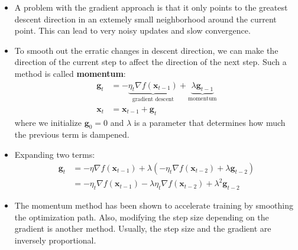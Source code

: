 \documentclass{article}
\newcommand{\tbf}[1]{\textbf{#1}}
\newcommand{\mbf}[1]{\mathbf{#1}}
\begin{document}
        \begin{itemize}
            \item A problem with the gradient approach is that it only points to the greatest descent direction in an extemely small neighborhood around the current point. 
            This can lead to very noisy updates and slow convergence.
            \item To smooth out the erratic changes in descent direction, we can make the direction of the current step to affect the direction of the next step. Such a method is called \tbf{momentum}:
            \begin{align*}
                \mbf{g}_t &= - \underbrace{\eta_t \nabla f(\mbf{x}_{t-1})}_{\text{gradient descent}} + \underbrace{\lambda \mbf{g}_{t-1}}_{\text{momentum}} \\
                \mbf{x}_t &= \mbf{x}_{t-1} + \mbf{g}_t
            \end{align*}
            where we initialize $\mbf{g}_0 = 0$ and $\lambda$ is a parameter that determines how much the previous term is dampened.
            \item Expanding two terms:
            \begin{align*}
                \mbf{g}_t &= - \eta \nabla f(\mbf{x}_{t-1}) + \lambda (-\eta_t \nabla f(\mbf{x}_{t-2})+\lambda \mbf{g}_{t-2}) \\
                &= -\eta_t \nabla f(\mbf{x}_{t-1}) - \lambda \eta_t \nabla f(\mbf{x}_{t-2}) + \lambda^2 \mbf{g}_{t-2}
            \end{align*}
            \item The momentum method has been shown to accelerate training by smoothing the optimization path. Also, modifying the step size depending on the gradient is another method. 
            Usually, the step size and the gradient are inversely proportional.
        \end{itemize}
        
\end{document}
